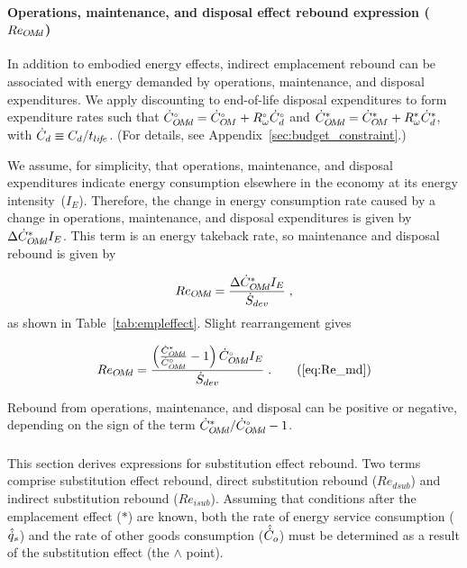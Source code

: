 \paragraph{Operations, maintenance, and disposal effect rebound expression ($Re_{O\!M\!d}$)} 
\label{sec:Re_OMd}

In addition to embodied energy effects, 
indirect emplacement rebound 
can be associated with energy demanded by
operations, maintenance, and disposal expenditures.
We apply discounting to end-of-life disposal expenditures
to form expenditure rates such that 
${}{\dot{C}}^{\scriptscriptstyle \circ}_{O\!M\!d} = {}{\dot{C}}^{\scriptscriptstyle \circ}_{O\!M} + {}{R}^{\scriptscriptstyle \circ}_\omega {}{\dot{C}}^{\scriptscriptstyle \circ}_d$
and
${\dot{C}}^*_{O\!M\!d} = {\dot{C}}^*_{O\!M} + {R}^*_\omega {\dot{C}}^*_d$,
with $\dot{C}_d \equiv C_d / t_{li\!f\!e}$.
(For details, see Appendix~\ref{sec:budget_constraint}.)

We assume, for simplicity, that operations, maintenance, and disposal expenditures 
indicate energy consumption
elsewhere in the economy at its energy intensity~($I_E$).
Therefore, the change in energy consumption rate caused by a change in 
operations, maintenance, and disposal expenditures
is given by $\Delta {\dot{C}}^*_{O\!M\!d} I_E$.
This term is an energy takeback rate,
so maintenance and disposal rebound is given by

\begin{equation} \label{eq:Re_md_def}
  Re_{O\!M\!d} = \frac{\Delta {\dot{C}}^*_{O\!M\!d} I_E}{\dot{S}_{dev}} \; ,
\end{equation}
%
as shown in Table~\ref{tab:empleffect}.
Slight rearrangement gives

\begin{equation}
  Re_{\omd} = \ReOMdeqn{} \; . \tag{\ref{eq:Re_md}}
\end{equation}

Rebound from operations, maintenance, and disposal can be positive or negative,
depending on the sign of the term ${\dot{C}}^*_{O\!M\!d}/{}{\dot{C}}^{\scriptscriptstyle \circ}_{O\!M\!d} - 1$.


\subsubsection{\Subeffect{}} 
\label{sec:Re_sub}

This section derives expressions for substitution effect rebound.
Two terms comprise substitution effect rebound,
direct substitution rebound ($Re_{dsub}$) and
indirect substitution rebound ($Re_{isub}$).
Assuming that conditions after the emplacement effect ($*$) are known, 
both the 
rate of energy service consumption ($\hat{\dot{q}}_s$) and
the rate of other goods consumption ($\hat{\dot{C}}_o$) 
must be determined as a result of the substitution effect
(the $\wedge$ point).


